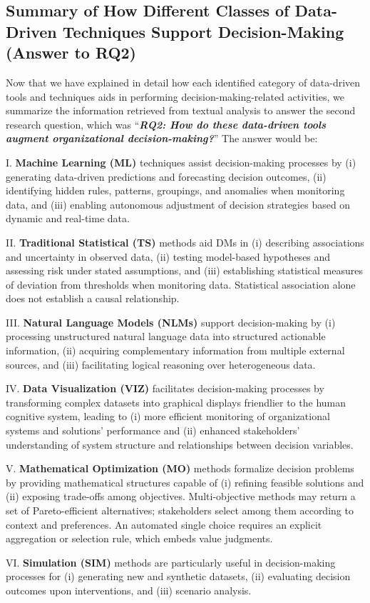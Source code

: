 \documentclass{sfuthesis}
\begin{document}
\subsection{Summary of How Different Classes of Data-Driven Techniques Support Decision-Making (Answer to RQ2)}
Now that we have explained in detail how each identified category of data-driven tools and techniques aids in performing decision-making-related activities, we summarize the information retrieved from textual analysis to answer the second research question, which was “\textbf{\textit{RQ2: How do these data-driven tools augment organizational decision-making?}}” The answer would be:\par
I.	\textbf{Machine Learning (ML)} techniques assist decision-making processes by (i) generating data-driven predictions and forecasting decision outcomes, (ii) identifying hidden rules, patterns, groupings, and anomalies when monitoring data, and (iii) enabling autonomous adjustment of decision strategies based on dynamic and real-time data.\par
II.	\textbf{Traditional Statistical (TS)} methods aid DMs in (i) describing associations and uncertainty in observed data, (ii) testing model-based hypotheses and assessing risk under stated assumptions, and (iii) establishing statistical measures of deviation from thresholds when monitoring data. Statistical association alone does not establish a causal relationship.\par
III. \textbf{Natural Language Models (NLMs)} support decision-making by (i) processing unstructured natural language data into structured actionable information, (ii) acquiring complementary information from multiple external sources, and (iii) facilitating logical reasoning over heterogeneous data.\par
IV. \textbf{Data Visualization (VIZ)} facilitates decision-making processes by transforming complex datasets into graphical displays friendlier to the human cognitive system, leading to (i) more efficient monitoring of organizational systems and solutions’ performance and (ii) enhanced stakeholders’ understanding of system structure and relationships between decision variables.\par
V.	\textbf{Mathematical Optimization (MO)} methods formalize decision problems by providing mathematical structures capable of (i) refining feasible solutions and (ii) exposing trade-offs among objectives. Multi-objective methods may return a set of Pareto-efficient alternatives; stakeholders select among them according to context and preferences. An automated single choice requires an explicit aggregation or selection rule, which embeds value judgments.\par
VI.	\textbf{Simulation (SIM)} methods are particularly useful in decision-making processes for (i) generating new and synthetic datasets, (ii) evaluating decision outcomes upon interventions, and (iii) scenario analysis.  
\end{document}
